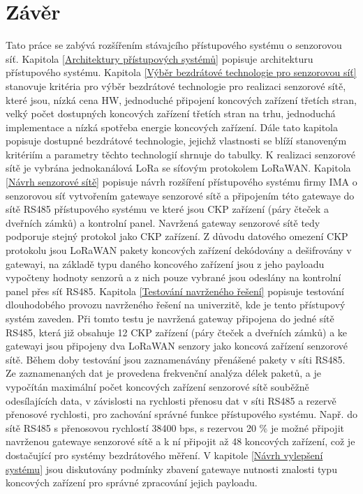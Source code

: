 \chapter{Závěr}
%
Tato práce se zabývá rozšířením stávajcího přístupového systému o senzorovou síť.
%
Kapitola \ref{Architektury přístupových systémů} popisuje architekturu přístupového systému.
%
Kapitola \ref{Výběr bezdrátové technologie pro senzorovou síť} stanovuje kritéria pro výběr bezdrátové technologie pro realizaci senzorové sítě, které jsou, nízká cena HW, jednoduché připojení  koncových zařízení třetích stran, velký počet dostupných koncových zařízení třetích stran na trhu, jednoduchá implementace a nízká spotřeba energie koncových zařízení.
Dále tato kapitola popisuje dostupné bezdrátové technologie, jejichž vlastnosti se blíží stanoveným kritériím a parametry těchto technologií shrnuje do tabulky. 
K realizaci senzorové sítě je vybrána jednokanálová LoRa se síťovým protokolem LoRaWAN.
%
Kapitola \ref{Návrh senzorové sítě} popisuje návrh rozšíření přístupového systému firmy IMA o senzorovou síť vytvořením gatewaye senzorové sítě a připojením této gatewaye do sítě RS485 přístupového systému ve které jsou CKP zařízení (páry čteček a dveřních zámků) a kontrolní panel. Navržená gateway senzorové sítě tedy podporuje stejný protokol jako CKP zařízení.
Z důvodu datového omezení CKP protokolu jsou LoRaWAN pakety koncových zařízení dekódovány a dešifrovány v gatewayi, na základě typu daného koncového zařízení jsou z jeho payloadu vypočteny hodnoty senzorů a z nich pouze vybrané jsou odeslány na kontrolní panel přes síť RS485.
%
Kapitola \ref{Testování navrženého řešení} popisuje testování dlouhodobého provozu navrženého řešení na univerzitě, kde je tento přístupový systém zaveden. 
Při tomto testu je navržená gateway připojena do jedné sítě RS485, která již obsahuje 12 CKP zařízení (páry čteček a dveřních zámků) a ke gatewayi jsou připojeny dva LoRaWAN senzory jako koncová zařízení senzorové sítě.
Během doby testování jsou zaznamenávány přenášené pakety v síti RS485.
Ze zaznamenaných dat je provedena frekvenční analýza délek paketů, a je vypočítán maximální počet koncových zařízení senzorové sítě souběžně odesílajících data, v závislosti na rychlosti přenosu dat v síti RS485 a rezervě přenosové rychlosti, pro zachování správné funkce přístupového systému.
Např. do sítě RS485 s přenosovou rychlostí 38400 bps, s rezervou 20 \% je možné připojit navrženou gatewaye senzorové sítě a k ní připojit až 48 koncových zařízení, což je dostačující pro systémy bezdrátového měření.
%
V kapitole \ref{Návrh vylepšení systému} jsou diskutovány podmínky zbavení gatewaye nutnosti znalosti typu koncových zařízení pro správné zpracování jejich payloadu. 
